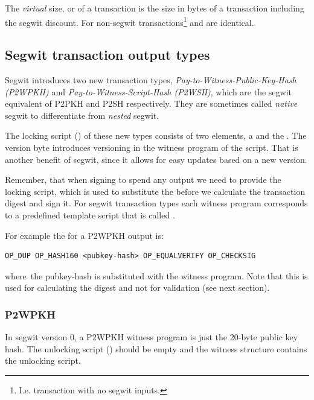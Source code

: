 The \emph{virtual} size, or  of a transaction is the size in bytes of a transaction including the segwit discount. For non-segwit transactions\footnote{I.e. transaction with no segwit inputs.}  and  are identical.


\subsection*{Segwit transaction output types}
Segwit introduces two new transaction types, \emph{Pay-to-Witness-Public-Key-Hash (P2WPKH)} and \emph{Pay-to-Witness-Script-Hash (P2WSH)}, which are the segwit equivalent of P2PKH and P2SH respectively. They are sometimes called \emph{native} segwit to differentiate from \emph{nested} segwit.

The locking script () of these new types consists of two elements, a  and the . The version byte introduces versioning in the witness program of the script. That is another benefit of segwit, since it allows for easy updates based on a new version.

Remember, that when signing to spend any output we need to provide the locking script, which is used to substitute the  before we calculate the transaction digest and sign it. For segwit transaction types each witness program corresponds to a predefined template script that is called .

For example the  for a P2WPKH output is:

\begin{emphbox}
\begin{lstlisting}[style=Pseudomath]
OP_DUP OP_HASH160 <pubkey-hash> OP_EQUALVERIFY OP_CHECKSIG
\end{lstlisting}
\end{emphbox}

where the pubkey-hash is substituted with the witness program. Note that this is used for calculating the digest and not for validation (see next section).

\subsubsection*{P2WPKH}
In segwit version 0, a P2WPKH witness program is just the 20-byte public key hash. The unlocking script () should be empty and the witness structure contains the unlocking script.

